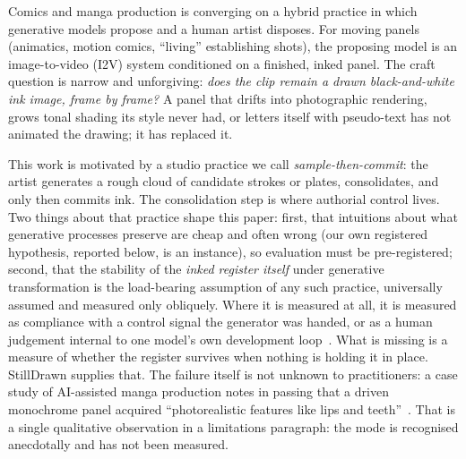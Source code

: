 \documentclass[11pt]{article}
\begin{document}
Comics and manga production is converging on a hybrid practice in which
generative models propose and a human artist disposes. For moving panels (animatics, motion comics, ``living'' establishing shots),
the proposing model is an image-to-video (I2V) system conditioned on a finished, inked panel. The
craft question is narrow and unforgiving: \emph{does the clip remain a drawn
black-and-white ink image, frame by frame?} A panel that drifts into
photographic rendering, grows tonal shading its style never had, or letters
itself with pseudo-text has not animated the drawing; it has replaced it.

This work is motivated by a studio practice we call
\emph{sample-then-commit}: the artist generates a rough cloud of candidate
strokes or plates, consolidates, and only then commits ink. The
consolidation step is where authorial control lives. Two things about that
practice shape this paper: first, that intuitions about what generative
processes preserve are cheap and
often wrong (our own registered hypothesis, reported below, is an
instance), so evaluation must be pre-registered; second, that the
stability of the \emph{inked register itself} under generative transformation
is the load-bearing assumption of any such practice, universally assumed
and measured only obliquely. Where it is measured at all, it is measured as
compliance with a control signal the generator was handed, or as a human
judgement internal to one model's own development
loop~\cite{huang2024lvcd,tencent2026animatrix}. What is missing is a measure
of whether the register survives when nothing is holding it in place.
StillDrawn supplies that. The failure itself is not unknown to practitioners:
a case study of AI-assisted manga production notes in passing that a driven
monochrome panel acquired ``photorealistic features like lips and
teeth''~\cite{zhang2025panelsouls}. That is a single qualitative observation
in a limitations paragraph: the mode is
recognised anecdotally and has not been measured.
\end{document}

